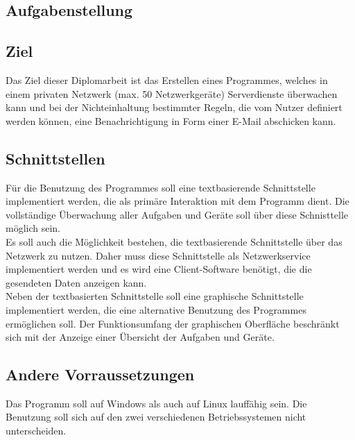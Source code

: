 \documentclass[12pt,a4paper]{report}
\begin{document}
\begin{singlespace}
\tableofcontents
\newpage
\end{singlespace}
\pagestyle{fancy}
\begin{onehalfspace}
\chapter{Aufgabenstellung}

\section{Ziel}

Das Ziel dieser Diplomarbeit ist das Erstellen eines Programmes, welches in einem privaten Netzwerk (max. 50 Netzwerkgeräte) Serverdienste überwachen kann und bei der Nichteinhaltung bestimmter Regeln, die vom Nutzer definiert werden können, eine Benachrichtigung in Form einer E-Mail abschicken kann.

\section{Schnittstellen}

Für die Benutzung des Programmes soll eine textbasierende Schnittstelle implementiert werden, die als primäre Interaktion mit dem Programm dient. Die vollständige Überwachung aller Aufgaben und Geräte soll über diese Schnisttelle möglich sein.\\

Es soll auch die Möglichkeit bestehen, die textbasierende Schnittstelle über das Netzwerk zu nutzen. Daher muss diese Schnittstelle als Netzwerkservice implementiert werden und es wird eine Client-Software benötigt, die die gesendeten Daten anzeigen kann.\\

Neben der textbasierten Schnittstelle soll eine graphische Schnittstelle implementiert werden, die eine alternative Benutzung des Programmes ermöglichen soll. Der Funktionsumfang der graphischen Oberfläche beschränkt sich mit der Anzeige einer Übersicht der Aufgaben und Geräte.

\section{Andere Vorraussetzungen}

Das Programm soll auf Windows als auch auf Linux lauffähig sein. Die Benutzung soll sich auf den zwei verschiedenen Betriebssystemen nicht unterscheiden.\\


\end{onehalfspace}
\end{document}
